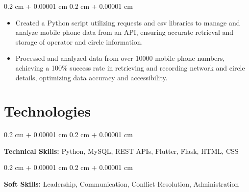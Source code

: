 \documentclass[12pt, letterpaper]{article}
\newenvironment{highlights}{
    \begin{itemize}[
        topsep=0.10 cm,
        parsep=0.10 cm,
        partopsep=0pt,
        itemsep=0pt,
        leftmargin=0.4 cm + 10pt
    ]
}{
    \end{itemize}
} %
\newenvironment{onecolentry}{
    \begin{adjustwidth}{
        0.2 cm + 0.00001 cm
    }{
        0.2 cm + 0.00001 cm
    }
}{
    \end{adjustwidth}
} %
\begin{document}
        \vspace{0.10 cm}
        \begin{onecolentry}
            \begin{highlights}
                \item Created a Python script utilizing requests and csv libraries to manage and analyze mobile phone data from an API, ensuring accurate retrieval and storage of operator and circle information.
                \item Processed and analyzed data from over 10000 mobile phone numbers, achieving a 100\% success rate in retrieving and recording network and circle details, optimizing data accuracy and accessibility.
            \end{highlights}
        \end{onecolentry}



    
    \section{Technologies}



        
        \begin{onecolentry}
            \textbf{Technical Skills:} Python, MySQL, REST APIs, Flutter, Flask, HTML, CSS
        \end{onecolentry}

        \vspace{0.2 cm}

        \begin{onecolentry}
            \textbf{Soft Skills:} Leadership, Communication, Conflict Resolution, Administration
        \end{onecolentry}


    
\end{document}
